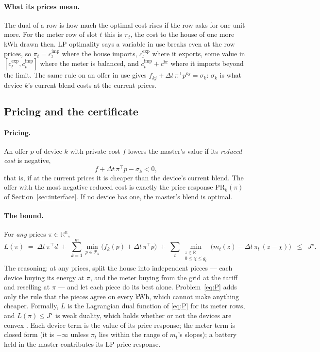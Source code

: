 \documentclass[11pt,a4paper]{article}
\newcommand{\R}{\mathbb{R}}
\newcommand{\dt}{\Delta t}
\newcommand{\cimp}{c^{\mathrm{imp}}}
\newcommand{\cexp}{c^{\mathrm{exp}}}
\newcommand{\cbr}{c^{\mathrm{br}}}
\newcommand{\PR}{\mathrm{PR}}
\newcommand{\Pk}{\mathcal P_k}
\begin{document}
\paragraph{What its prices mean.} The dual of a row is how much the optimal
cost rises if the row asks for one unit more. For the meter row of slot $t$
this is $\pi_t$, the cost to the house of one more kWh drawn then. LP optimality
says a variable in use breaks even at the row prices, so $\pi_t = \cimp_t$ where
the house imports, $\cexp_t$ where it exports, some value in
$[\cexp_t, \cimp_t]$ where the meter is balanced, and $\cimp_t + \cbr$ where it
imports beyond the limit. The same rule on an offer in use gives
$f_{kj} + \dt\,\pi^{\!\top} p^{kj} = \sigma_k$: $\sigma_k$ is what device $k$'s
current blend costs at the current prices.

\subsection{Pricing and the certificate}
\label{sec:bound}

\paragraph{Pricing.} An offer $p$ of device $k$ with private cost $f$ lowers the
master's value if its \emph{reduced cost} is negative,
\begin{equation}
  f + \dt\,\pi^{\!\top} p - \sigma_k < 0 ,
  \label{eq:reduced}
\end{equation}
that is, if at the current prices it is cheaper than the device's current blend.
The offer with the most negative reduced cost is exactly the price response
$\PR_k(\pi)$ of Section~\ref{sec:interface}. If no device has one, the master's
blend is optimal.

\paragraph{The bound.} For \emph{any} prices $\pi \in \R^n$,
\begin{equation}
  L(\pi) \;=\; \dt\,\pi^{\!\top} d
  \;+\; \sum_{k=1}^m \min_{p \in \Pk}\big(f_k(p) + \dt\,\pi^{\!\top} p\big)
  \;+\; \sum_t \min_{\substack{z \in \R \\ 0 \le \chi \le g_t}} \big(m_t(z) - \dt\,\pi_t\,(z - \chi)\big)
  \;\;\le\;\; J^\star .
  \label{eq:bound}
\end{equation}
The reasoning: at any prices, split the house into independent pieces --- each
device buying its energy at $\pi$, and the meter buying from the grid at the
tariff and reselling at $\pi$ --- and let each piece do its best alone.
Problem~\eqref{eq:P} adds only the rule that the pieces agree on every kWh, which
cannot make anything cheaper. Formally, $L$ is the Lagrangian dual function of
\eqref{eq:P} for its meter rows, and $L(\pi) \le J^\star$ is weak duality, which
holds whether or not the devices are convex \cite[Ch.~5]{boydvandenberghe2004}.
Each device term is the value of its price response; the meter term is closed
form (it is $-\infty$ unless $\pi_t$ lies within the range of $m_t$'s slopes);
a battery held in the master contributes its LP price response.
\end{document}
